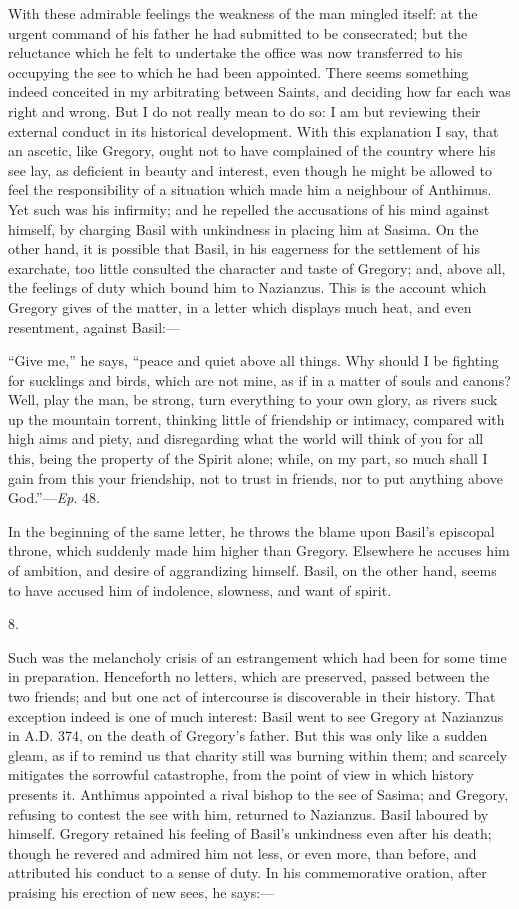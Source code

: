 With these admirable feelings the weakness of the man mingled
itself: at the urgent command of his father he had submitted to be
consecrated; but the reluctance which he felt to undertake the office
was now transferred to his occupying the see to which he had been
appointed. There seems something indeed conceited in my
arbitrating between Saints, and deciding how far each was right and
wrong. But I do not really mean to do so: I am but reviewing their
external conduct in its historical development. With this explanation
I say, that an ascetic, like Gregory, ought not to have complained of
the country where his see lay, as deficient in beauty and interest,
even though he might be allowed to feel the responsibility of a
situation which made him a neighbour of Anthimus. Yet such was his
infirmity; and he repelled the accusations of his mind against
himself, by charging Basil with unkindness in placing him at Sasima.
On the other hand, it is possible that Basil, in his eagerness for the
settlement of his exarchate, too little consulted the character and
taste of Gregory; and, above all, the feelings of duty which bound him
to Nazianzus. This is the account which Gregory gives of the matter,
in a letter which displays much heat, and even resentment, against
Basil:—

``Give me,'' he says, ``peace and quiet above all
things. Why should I be fighting for sucklings and birds, which are
not mine, as if in a matter of souls and canons? Well, play the man,
be strong, turn everything to your own glory, as rivers suck up the
mountain torrent, thinking little of friendship or intimacy, compared
with high aims and piety, and disregarding what the world will think
of you for all this, being the property of the Spirit alone; while, on
my part, so much shall I gain from this your friendship, not to trust
in friends, nor to put anything above God.''—\emph{Ep}. 48.

In the beginning of the same letter, he throws the blame upon Basil's
episcopal throne, which suddenly made him higher than Gregory.
Elsewhere he accuses him of ambition, and desire of aggrandizing
himself. Basil, on the other hand, seems to have accused him of
indolence, slowness, and want of spirit.

8.

Such was the melancholy crisis of an estrangement which had been
for some time in preparation. Henceforth no letters, which are
preserved, passed between the two friends; and but one act of
intercourse is discoverable in their history. That exception indeed is
one of much interest: Basil went to see Gregory at Nazianzus in A.D.
374, on the death of Gregory's father. But this was only like a sudden
gleam, as if to remind us that charity still was burning within them;
and scarcely mitigates the sorrowful catastrophe, from the point of
view in which history presents it. Anthimus appointed a rival bishop
to the see of Sasima; and Gregory, refusing to contest the see with
him, returned to Nazianzus. Basil laboured by himself. Gregory
retained his feeling of Basil's unkindness even after his death;
though he revered and admired him not less, or even more, than before,
and attributed his conduct to a sense of duty. In his commemorative
oration, after praising his erection of new sees, he says:—

